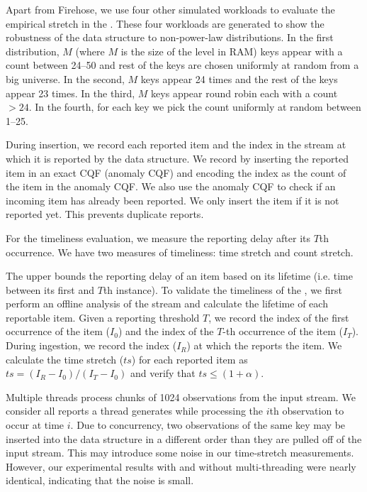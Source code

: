 \label{diff_dist} Apart from Firehose, we use four other
simulated workloads to evaluate the empirical stretch in the \ts. These four
workloads are generated to show the robustness of
the data structure to non-power-law distributions. In the first
distribution, $M$ (where $M$ is the size of the level in RAM) keys appear with a
count between 24--50 and rest of the keys are chosen uniformly at random from a
big universe. In the second, $M$ keys appear 24 times and the rest of the keys
appear 23 times. In the third, $M$ keys appear round robin each with a
count $>24$. In the fourth, for each key we pick the count uniformly at random
between 1--25.

 During insertion, we record each reported
item and the index in the stream at which it is reported by the data structure.
We record by inserting the reported item in an exact CQF (anomaly CQF) and
encoding the index as the count of the item in the anomaly CQF.
%
We also use the anomaly CQF to check if an incoming item has already been
reported. 
We only insert the item if
it is not reported yet. This prevents duplicate reports. 

 For the timeliness evaluation, we measure the reporting delay
after its $T$th occurrence. We have two measures
of timeliness: time stretch and count stretch.

The \ts upper bounds the reporting delay  of an item based on its lifetime (i.e. time between its first
and $T$th instance). To validate the
timeliness of the \ts, we first perform an offline analysis of the stream and calculate the
lifetime of each reportable item.
%
Given a reporting threshold $T$, we record the index of the first occurrence of
the item ($I_0$) and the index of the $T$-th occurrence of the item ($I_T$).
%
During ingestion, we record the index ($I_R$) at which the \ts reports the item.
We calculate the time stretch ($ts$) for each
reported item as $ts = (I_R-I_0)/(I_T-I_0)$ and verify that $ts \leq (1+
\alpha)$.

Multiple threads process chunks of 1024
observations from the input stream.  We consider all reports a thread generates 
while processing the $i$th observation to occur
at time $i$.  Due to concurrency, two observations
of the same key may be inserted into the data structure in a
different order than they are pulled off of the input stream.  This
may introduce some noise in our time-stretch measurements.  However,
our experimental results with and without multi-threading were nearly
identical, indicating that the noise is small.

